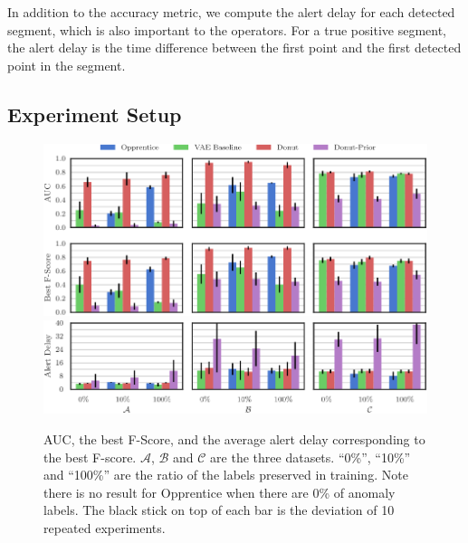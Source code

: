 \documentclass[sigconf]{acmart}
\newcommand\compactvspace[1]{\vspace{#1}}
\newcommand\compactvspace[1]{}
\newcommand{\DATASETA}{$\mathcal{A}$}
\newcommand{\DATASETB}{$\mathcal{B}$}
\newcommand{\DATASETC}{$\mathcal{C}$}
\begin{document}
In addition to the accuracy metric, we compute the alert delay for each detected segment, which is also important to  the operators. For a true positive segment, the alert delay is the time difference between the first point and the first detected point in the segment.


\compactvspace{-1em}
\subsection{Experiment Setup}
\label{sec:experiment-setup}

\begin{figure}
\begin{flushright}
	\includegraphics[width=\columnwidth]{overall_perf}\vspace{.6em}
	\includegraphics[width=\columnwidth]{delay_perf}
	\caption{
		AUC, the best F-Score, and the average alert delay corresponding to the best F-score.
		\DATASETA{}, \DATASETB{} and \DATASETC{} are the three datasets.
		``0\%'', ``10\%'' and ``100\%'' are the ratio of the labels preserved in training.  Note there is no result for Opprentice when there are 0\% of anomaly labels.
		The black stick on top of each bar is the deviation of 10 repeated experiments.
	}
	\label{fig:overall-perf}
\end{flushright}
\end{figure}
\end{document}
